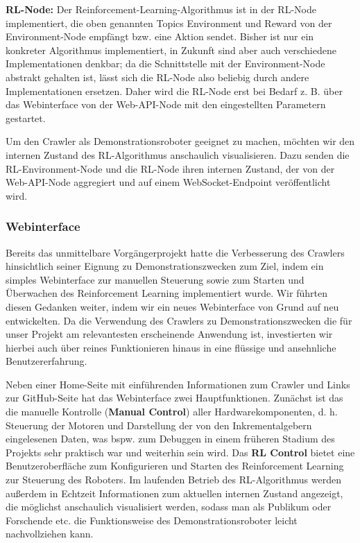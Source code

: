 \textbf{RL-Node:} Der Reinforcement-Learning-Algorithmus ist in der RL-Node implementiert, die oben genannten Topics Environment und Reward von der Environment-Node empfängt bzw. eine Aktion sendet. Bisher ist nur ein konkreter Algorithmus implementiert, in Zukunft sind aber auch verschiedene Implementationen denkbar; da die Schnittstelle mit der Environment-Node abstrakt gehalten ist, lässt sich die RL-Node also beliebig durch andere Implementationen ersetzen. Daher wird die RL-Node erst bei Bedarf z. B. über das Webinterface von der Web-API-Node mit den eingestellten Parametern gestartet.

Um den Crawler als Demonstrationsroboter geeignet zu machen, möchten wir den internen Zustand des RL-Algorithmus anschaulich visualisieren. Dazu senden die RL-Environment-Node und die RL-Node ihren internen Zustand, der von der Web-API-Node aggregiert und auf einem WebSocket-Endpoint veröffentlicht wird. 

\subsubsection{Webinterface}

Bereits das unmittelbare Vorgängerprojekt hatte die Verbesserung des Crawlers hinsichtlich seiner Eignung zu Demonstrationszwecken zum Ziel, indem ein simples Webinterface zur manuellen Steuerung sowie zum Starten und Überwachen des Reinforcement Learning implementiert wurde. Wir führten diesen Gedanken weiter, indem wir ein neues Webinterface von Grund auf neu entwickelten. Da die Verwendung des Crawlers zu Demonstrationszwecken die für unser Projekt am relevantesten erscheinende Anwendung ist, investierten wir hierbei auch über reines Funktionieren hinaus in eine flüssige und ansehnliche Benutzererfahrung. 

Neben einer Home-Seite mit einführenden Informationen zum Crawler und Links zur GitHub-Seite hat das Webinterface zwei Hauptfunktionen. Zunächst ist das die manuelle Kontrolle (\textbf{Manual Control}) aller Hardwarekomponenten, d. h. Steuerung der Motoren und Darstellung der von den Inkrementalgebern eingelesenen Daten, was bspw. zum Debuggen in einem früheren Stadium des Projekts sehr praktisch war und weiterhin sein wird. Das \textbf{RL Control} bietet eine Benutzeroberfläche zum Konfigurieren und Starten des Reinforcement Learning zur Steuerung des Roboters. Im laufenden Betrieb des RL-Algorithmus werden außerdem in Echtzeit Informationen zum aktuellen internen Zustand angezeigt, die möglichst anschaulich visualisiert werden, sodass man als Publikum oder Forschende etc. die Funktionsweise des Demonstrationsroboter leicht nachvollziehen kann.

